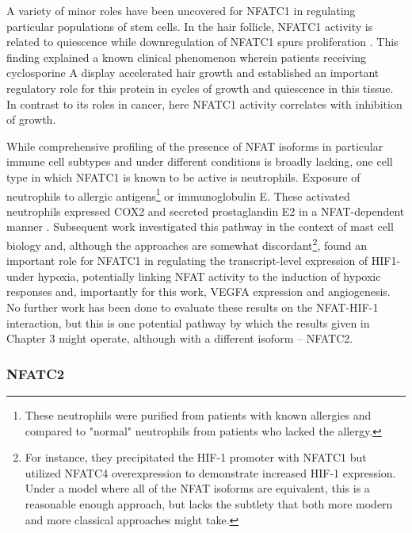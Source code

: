 A variety of minor roles have been uncovered for NFATC1 in regulating particular populations of stem cells. In the hair follicle, NFATC1 activity is related to quiescence while downregulation of NFATC1 spurs proliferation \citep{Horsley2008}. This finding explained a known clinical phenomenon wherein patients receiving cyclosporine A display accelerated hair growth and established an important regulatory role for this protein in cycles of growth and quiescence in this tissue. In contrast to its roles in cancer, here NFATC1 activity correlates with inhibition of growth. 

While comprehensive profiling of the presence of NFAT isoforms in particular immune cell subtypes and under different conditions is broadly lacking, one cell type in which NFATC1 is known to be active is neutrophils. Exposure of neutrophils to allergic antigens\footnote{These neutrophils were purified from patients with known allergies and compared to "normal" neutrophils from patients who lacked the allergy.} or immunoglobulin E. These activated neutrophils expressed COX2 and secreted prostaglandin E2 in a NFAT-dependent manner \citep{Vega2007}. Subsequent work investigated this pathway in the context of mast cell biology and, although the approaches are somewhat discordant\footnote{For instance, they precipitated the HIF-1\textalpha{} promoter with NFATC1 but utilized NFATC4 overexpression to demonstrate increased HIF-1\textalpha{} expression. Under a model where all of the NFAT isoforms are equivalent, this is a reasonable enough approach, but lacks the subtlety that both more modern and more classical approaches might take.}, found an important role for NFATC1 in regulating the transcript-level expression of HIF1-\textalpha{} under hypoxia, potentially linking NFAT activity to the induction of hypoxic responses and, importantly for this work, VEGFA expression and angiogenesis. No further work has been done to evaluate these results on the NFAT-HIF-1\textalpha{} interaction, but this is one potential pathway by which the results given in Chapter 3 might operate, although with a different isoform -- NFATC2.

\subsubsection{NFATC2}\label{nfatc2}

